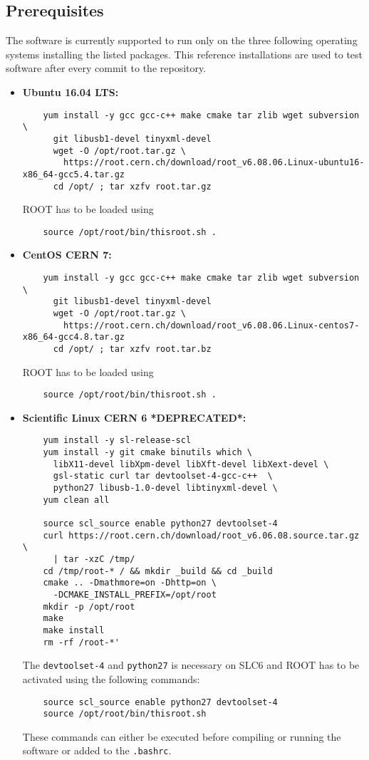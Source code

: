 \documentclass{article}
\begin{document}
\subsection{Prerequisites}
The software is currently supported to run only on the three following operating systems installing the listed packages. This reference installations are used to test software after every commit to the repository.
\begin{itemize}
\item \textbf{Ubuntu 16.04 LTS:}
  \begin{lstlisting}
    yum install -y gcc gcc-c++ make cmake tar zlib wget subversion \
      git libusb1-devel tinyxml-devel
      wget -O /opt/root.tar.gz \
        https://root.cern.ch/download/root_v6.08.06.Linux-ubuntu16-x86_64-gcc5.4.tar.gz
      cd /opt/ ; tar xzfv root.tar.gz
  \end{lstlisting}
  ROOT has to be loaded using
  \begin{lstlisting}
    source /opt/root/bin/thisroot.sh .
  \end{lstlisting}
  \newpage
\item \textbf{CentOS CERN 7:}
  \begin{lstlisting}
    yum install -y gcc gcc-c++ make cmake tar zlib wget subversion \
      git libusb1-devel tinyxml-devel
      wget -O /opt/root.tar.gz \
        https://root.cern.ch/download/root_v6.08.06.Linux-centos7-x86_64-gcc4.8.tar.gz
      cd /opt/ ; tar xzfv root.tar.bz
  \end{lstlisting}
  ROOT has to be loaded using
  \begin{lstlisting}
    source /opt/root/bin/thisroot.sh .
  \end{lstlisting}
\item \textbf{Scientific Linux CERN 6 *DEPRECATED*:}
  \begin{lstlisting}
    yum install -y sl-release-scl
    yum install -y git cmake binutils which \
      libX11-devel libXpm-devel libXft-devel libXext-devel \
      gsl-static curl tar devtoolset-4-gcc-c++  \
      python27 libusb-1.0-devel libtinyxml-devel \
    yum clean all

    source scl_source enable python27 devtoolset-4
    curl https://root.cern.ch/download/root_v6.06.08.source.tar.gz \
      | tar -xzC /tmp/
    cd /tmp/root-* / && mkdir _build && cd _build
    cmake .. -Dmathmore=on -Dhttp=on \
      -DCMAKE_INSTALL_PREFIX=/opt/root
    mkdir -p /opt/root
    make
    make install
    rm -rf /root-*'
  \end{lstlisting}
  The \texttt{devtoolset-4} and \texttt{python27} is necessary on SLC6 and ROOT has to be activated using the following commands:
  \begin{lstlisting}
    source scl_source enable python27 devtoolset-4
    source /opt/root/bin/thisroot.sh
  \end{lstlisting}
  These commands can either be executed before compiling or running the software or added to the \texttt{.bashrc}.
\end{itemize}
\end{document}
